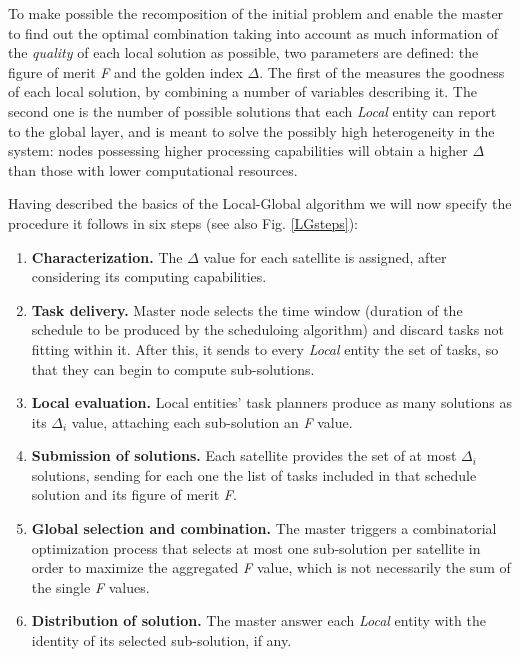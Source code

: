 To make possible the recomposition of the initial problem and enable the master to find out the optimal combination taking into account as much information of the \emph{quality} of each local solution as possible, two parameters are defined: the figure of merit \emph{F} and the golden index $ \Delta $. The first of the measures the goodness of each local solution, by combining a number of variables describing it. The second one is the number of possible solutions that each \emph{Local} entity can report to the global layer, and is meant to solve the possibly high heterogeneity in the system: nodes possessing higher processing capabilities will obtain a higher $ \Delta $ than those with lower computational resources.

Having described the basics of the Local-Global algorithm we will now specify the procedure it follows in six steps (see also Fig. \ref{LGsteps}):

\begin{enumerate}
\item \textbf{Characterization.} The $ \Delta $ value for each satellite is assigned, after considering its computing capabilities.
\item \textbf{Task delivery.} Master node selects the time window (duration of the schedule to be produced by the scheduloing algorithm) and discard tasks not fitting within it. After this, it sends to every \emph{Local} entity the set of tasks, so that they can begin to compute sub-solutions.
\item \textbf{Local evaluation.} Local entities' task planners produce as many solutions as its $ \Delta_i $ value, attaching each sub-solution an \emph{F} value.
\item \textbf{Submission of solutions.} Each satellite provides the set of at most $ \Delta_i $ solutions, sending for each one the list of tasks included in that schedule solution and its figure of merit \emph{F}.
\item \textbf{Global selection and combination.} The master triggers a combinatorial optimization process that selects at most one sub-solution per satellite in order to maximize the aggregated \emph{F} value, which is not necessarily the sum of the single \emph{F} values.
\item \textbf{Distribution of solution.} The master answer each \emph{Local} entity with the identity of its selected sub-solution, if any.
\end{enumerate}